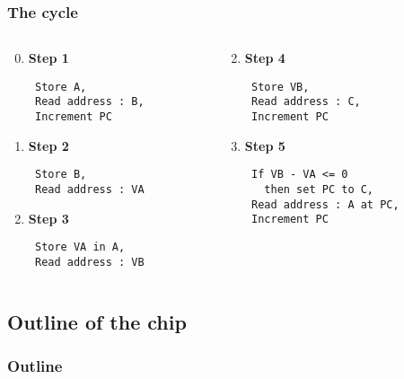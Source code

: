 \documentclass[slidestop]{beamer}
\begin{document}
\begin{frame}[fragile]
    \frametitle{The cycle}

    \begin{columns}[t]
        \begin{column}[T]{5cm}
    \begin{enumerate}
            \setcounter{enumi}{-1}

        \item \textbf{Step 1}
            \begin{lstlisting}
 Store A,
 Read address : B,
 Increment PC
            \end{lstlisting}
        \item \textbf{Step 2}
            \begin{lstlisting}
 Store B,
 Read address : VA
            \end{lstlisting}

        \item \textbf{Step 3}
            \begin{lstlisting}
 Store VA in A,
 Read address : VB
            \end{lstlisting}

    \end{enumerate}
\end{column}
\begin{column}[T]{5cm}
    \begin{enumerate}
        \setcounter{enumi}{1}
        \item \textbf{Step 4}
            \begin{lstlisting}
 Store VB,
 Read address : C,
 Increment PC
            \end{lstlisting}

        \item \textbf{Step 5}
            \begin{lstlisting}
 If VB - VA <= 0
   then set PC to C,
 Read address : A at PC,
 Increment PC
             \end{lstlisting}
    \end{enumerate}
\end{column}
\end{columns}

\end{frame}

\subsection{Outline of the chip}
\begin{frame}
    \frametitle{Outline}
    \centering
    
\end{frame}
\end{document}
